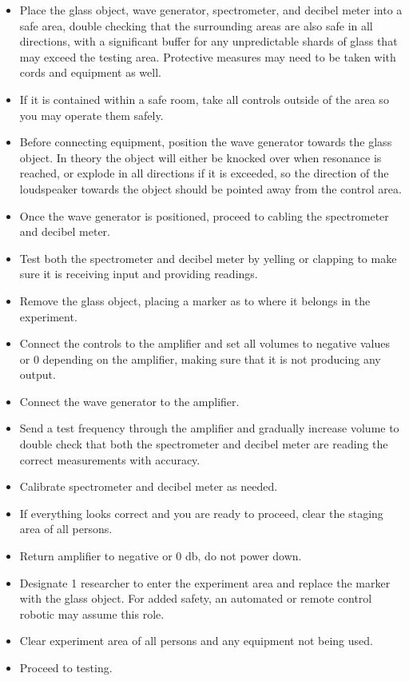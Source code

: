 \documentclass[12pt]{article}
\begin{document}
\begin{itemize}
    \item Place the glass object, wave generator, spectrometer, and decibel meter into a safe area, double checking that the surrounding areas are also safe in all directions, with a significant buffer for any unpredictable shards of glass that may exceed the testing area. Protective measures may need to be taken with cords and equipment as well.
    \item If it is contained within a safe room, take all controls outside of the area so you may operate them safely.
    \item Before connecting equipment, position the wave generator towards the glass object. In theory the object will either be knocked over when resonance is reached, or explode in all directions if it is exceeded, so the direction of the loudspeaker towards the object should be pointed away from the control area.
    \item Once the wave generator is positioned, proceed to cabling the spectrometer and decibel meter.
    \item Test both the spectrometer and decibel meter by yelling or clapping to make sure it is receiving input and providing readings.
    \item Remove the glass object, placing a marker as to where it belongs in the experiment.
    \item Connect the controls to the amplifier and set all volumes to negative values or 0 depending on the amplifier, making sure that it is not producing any output.
    \item Connect the wave generator to the amplifier.
    \item Send a test frequency through the amplifier and gradually increase volume to double check that both the spectrometer and decibel meter are reading the correct measurements with accuracy.
    \item Calibrate spectrometer and decibel meter as needed.
    \item If everything looks correct and you are ready to proceed, clear the staging area of all persons.
    \item Return amplifier to negative or 0 db, do not power down.
    \item Designate 1 researcher to enter the experiment area and replace the marker with the glass object. For added safety, an automated or remote control robotic may assume this role.
    \item Clear experiment area of all persons and any equipment not being used.
    \item Proceed to testing.
\end{itemize}
\end{document}
